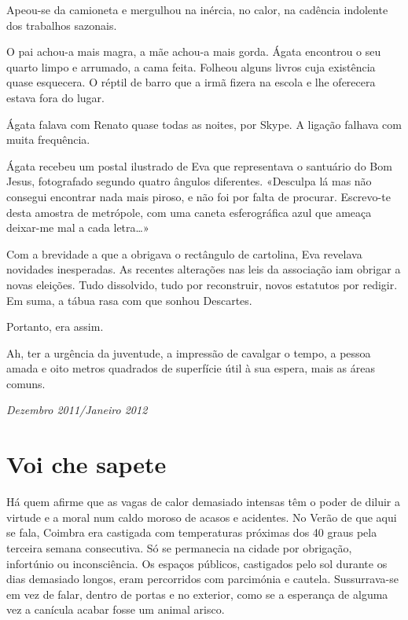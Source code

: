 Apeou-se da camioneta e mergulhou na inércia, no calor,
na cadência indolente dos trabalhos sazonais.

O pai achou-a mais magra, a mãe achou-a mais gorda. Ágata encontrou o
seu quarto limpo e arrumado, a cama feita. Folheou alguns livros cuja
existência quase esquecera. O réptil de barro que a irmã fizera na
escola e lhe oferecera estava fora do lugar.

Ágata falava com Renato quase todas as noites, por Skype.
A ligação falhava com muita frequência.

Ágata recebeu um postal ilustrado de Eva que representava o santuário
do Bom Jesus, fotografado segundo quatro ângulos diferentes. «Desculpa
lá mas não consegui encontrar nada mais piroso, e não foi por falta de
procurar. Escrevo-te desta amostra de metrópole, com uma caneta esferográfica azul que
ameaça deixar-me mal a cada letra\ldots{}»

Com a brevidade a que a obrigava o rectângulo de cartolina, Eva
revelava novidades inesperadas. As recentes alterações nas leis da
associação iam obrigar a novas eleições. Tudo dissolvido, tudo por
reconstruir, novos estatutos por redigir. Em suma, a tábua rasa com que
sonhou Descartes.

Portanto, era assim.

Ah, ter a urgência da juventude, a impressão de cavalgar o tempo, a
pessoa amada e oito metros quadrados de superfície útil à sua espera,
mais as áreas comuns.

\begin{flushright}
\emph{Dezembro 2011/Janeiro 2012}
\end{flushright}

\chapter{Voi che sapete}

Há quem afirme que as vagas de calor demasiado intensas têm o poder de
diluir a virtude e a moral num caldo moroso de acasos e acidentes. No
Verão de que aqui se fala, Coimbra era castigada com temperaturas
próximas dos 40 graus pela terceira semana consecutiva. Só se permanecia
na cidade por obrigação, infortúnio ou inconsciência. Os espaços
públicos, castigados pelo sol durante os dias demasiado longos, eram
percorridos com parcimónia e cautela. Sussurrava-se em vez de falar,
dentro de portas e no exterior, como se a esperança de alguma vez a
canícula acabar fosse um animal arisco.

